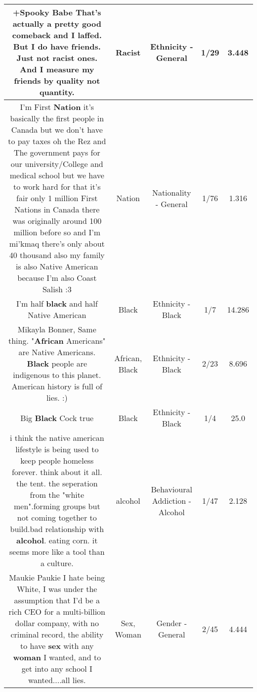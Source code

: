 \documentclass[11pt]{article}
\newlength\mylength
\begin{document}
\begin{center}
\begin{longtable}{|C{.65\mylength}|C{.30\mylength}|C{.12\mylength}|C{.12\mylength}|C{.12\mylength}|}
  \small +Spooky Babe That's actually a pretty good comeback and I laffed. But I do have friends. Just not \textbf{racist} ones. And I measure my friends by quality not quantity.\normalsize   & Racist & Ethnicity - General & 1/29 & 3.448 \\  \hline
  \small I'm First \textbf{Nation} it's basically the first people in Canada but we don't have to pay taxes oh the Rez and The government pays for our university/College  and medical school but we have to work hard for that it's fair only 1 million First Nations in Canada there was originally around 100 million before so and I'm mi'kmaq there's only about 40 thousand also my family is also Native American because I'm also Coast Salish :3\normalsize   & Nation & Nationality - General & 1/76 & 1.316 \\  \hline
  \small I'm half \textbf{black} and half Native American\normalsize   & Black & Ethnicity - Black & 1/7 & 14.286 \\  \hline
  \small Mikayla Bonner, Same thing. "\textbf{African} Americans" are Native Americans. \textbf{Black} people are indigenous to this planet. American history is full of lies. :)\normalsize   & African, Black & Ethnicity - Black & 2/23 & 8.696 \\  \hline
  \small Big \textbf{Black} Cock true\normalsize   & Black & Ethnicity - Black & 1/4 & 25.0 \\  \hline
  \small i think the native american lifestyle is being used to keep people homeless forever. think about it all. the tent. the seperation from the "white men".forming groups but not coming together to build.bad relationship with \textbf{alcohol}. eating corn. it seems more like a tool than a culture.\normalsize   & alcohol & Behavioural Addiction - Alcohol & 1/47 & 2.128 \\  \hline
  \small Maukie Paukie I hate being White, I was under the assumption that I'd be a rich CEO for a multi-billion dollar company, with no criminal record, the ability to have \textbf{sex} with any \textbf{woman} I wanted, and to get into any school I wanted....all lies.\normalsize   & Sex, Woman & Gender - General & 2/45 & 4.444 \\  \hline

\end{longtable}
\end{center}
\end{document}
